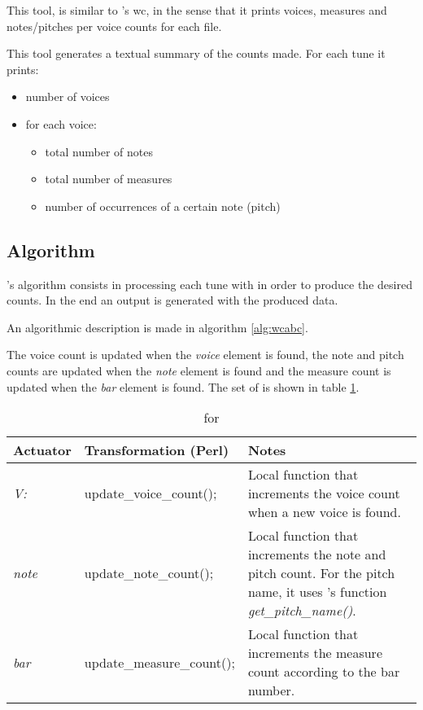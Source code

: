 This tool, is similar to \unix{}'s wc, in the sense that it prints voices, measures and
notes/pitches per voice counts for each \abc{} file.

This tool generates a textual summary of the counts made.
For each tune it prints:
\begin{itemize}
  \item number of voices
  \item for each voice:
  \begin{itemize}
    \item total number of notes
    \item total number of measures
    \item number of occurrences of a certain note (pitch)
  \end{itemize}
\end{itemize}

\subsection*{Algorithm}

\wcabc{}'s algorithm consists in processing each tune with \dt{} in order to produce the desired
counts. In the end an output is generated with the produced data.

An algorithmic description is made in algorithm \ref{alg:wcabc}.

The voice count is updated when the \emph{voice} element is found, the note and pitch counts are
updated when the \emph{note} element is found and the measure count is updated when the \emph{bar}
element is found. The set of \abcdtrules{} is shown in table \ref{tab:wc_abc_rules}.

\begin{center}
  \begin{table}[h]
    \begin{tabular}{|p{2cm}|p{5cm}|p{7.5cm}|}
      \hline
      Actuator & Transformation (Perl) & Notes\\
      \hline
      \hline
      \emph{V:} & update\_voice\_count(); & Local function that increments the voice count when a
      new voice is found.
      \\ \cline{1-2}
      \hline

      \hline
      \emph{note} & update\_note\_count(); & Local function that increments the note and pitch
      count. For the pitch name, it uses \abcdt{}'s function \emph{get\_pitch\_name()}.
      \\ \cline{1-2}
      \hline

      \hline
      \emph{bar} & update\_measure\_count(); & Local function that increments the measure count
      according to the bar number.
      \\ \cline{1-2}
      \hline
    \end{tabular}
    \caption{\abcdtrules{} for \wcabc{}}
    \label{tab:wc_abc_rules}
  \end{table}
\end{center}

